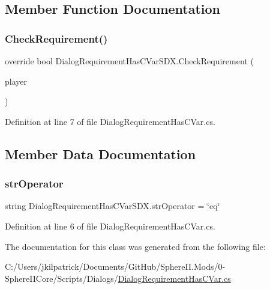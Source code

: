 \subsection{Member Function Documentation}
\mbox{\label{class_dialog_requirement_has_c_var_s_d_x_aeb43ee24f652abc4817d5dbc1b731c1f}} 
\subsubsection{\texorpdfstring{CheckRequirement()}{CheckRequirement()}}
{\footnotesize\ttfamily override bool Dialog\+Requirement\+Has\+C\+Var\+S\+D\+X.\+Check\+Requirement (\begin{DoxyParamCaption}\item[{Entity\+Player}]{player }\end{DoxyParamCaption})}



Definition at line 7 of file Dialog\+Requirement\+Has\+C\+Var.\+cs.



\subsection{Member Data Documentation}
\mbox{\label{class_dialog_requirement_has_c_var_s_d_x_afe5be795d397ed4d4465f226b45f9445}} 
\subsubsection{\texorpdfstring{strOperator}{strOperator}}
{\footnotesize\ttfamily string Dialog\+Requirement\+Has\+C\+Var\+S\+D\+X.\+str\+Operator = \char`\"{}eq\char`\"{}}



Definition at line 6 of file Dialog\+Requirement\+Has\+C\+Var.\+cs.



The documentation for this class was generated from the following file\+:\begin{DoxyCompactItemize}
\item 
C\+:/\+Users/jkilpatrick/\+Documents/\+Git\+Hub/\+Sphere\+I\+I.\+Mods/0-\/\+Sphere\+I\+I\+Core/\+Scripts/\+Dialogs/\mbox{\hyperlink{_dialog_requirement_has_c_var_8cs}{Dialog\+Requirement\+Has\+C\+Var.\+cs}}\end{DoxyCompactItemize}
